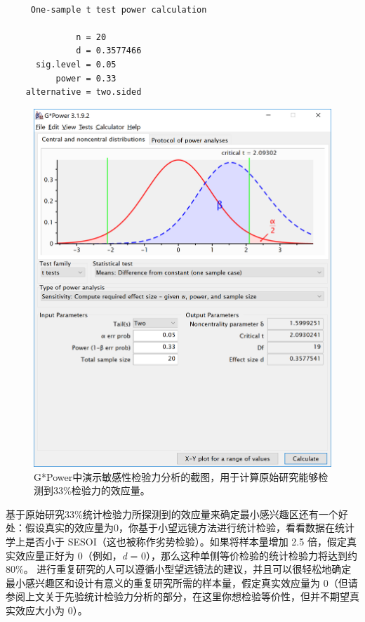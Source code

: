 \documentclass[
  letterpaper,
  DIV=11,
  numbers=noendperiod]{scrreprt}
\begin{document}
\begin{verbatim}

     One-sample t test power calculation 

              n = 20
              d = 0.3577466
      sig.level = 0.05
          power = 0.33
    alternative = two.sided
\end{verbatim}

\begin{figure}

{\centering \includegraphics[width=1\textwidth,height=\textheight]{images/0deabffd850f7b63c16e41e0af9ae0b6.png}

}

\caption{\label{fig-smalltelpower}G*Power中演示敏感性检验力分析的截图，用于计算原始研究能够检测到33\%检验力的效应量。}

\end{figure}

基于原始研究33\%统计检验力所探测到的效应量来确定最小感兴趣区还有一个好处：假设真实的效应量为0，你基于小望远镜方法进行统计检验，看看数据在统计学上是否小于
SESOI（这也被称作劣势检验）。如果将样本量增加 2.5
倍，假定真实效应量正好为 0（例如，\emph{d} =
0），那么这种单侧等价检验的统计检验力将达到约 80\%。
进行重复研究的人可以遵循小型望远镜法的建议，并且可以很轻松地确定最小感兴趣区和设计有意义的重复研究所需的样本量，假定真实效应量为
0（但请参阅上文关于先验统计检验力分析的部分，在这里你想检验等价性，但并不期望真实效应大小为
0）。
\end{document}
